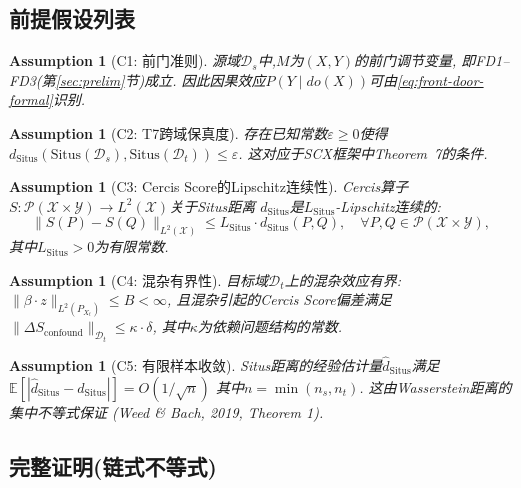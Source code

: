 \documentclass[12pt,a4paper]{article}
\newtheorem{assumption}[theorem]{Assumption}
\newcommand{\E}{\mathbb{E}}
\newcommand{\cX}{\mathcal{X}}
\newcommand{\cY}{\mathcal{Y}}
\newcommand{\cD}{\mathcal{D}}
\newcommand{\cP}{\mathcal{P}}
\newcommand{\Situs}{\mathrm{Situs}}
\begin{document}
\subsection{前提假设列表}

\begin{assumption}[C1: 前门准则]\label{ass:C1}
    源域$\cD_s$中,$M$为$(X,Y)$的前门调节变量,
    即FD1--FD3(第\ref{sec:prelim}节)成立.
    因此因果效应$P(Y \mid do(X))$可由\eqref{eq:front-door-formal}识别.
\end{assumption}

\begin{assumption}[C2: T7跨域保真度]\label{ass:C2}
    存在已知常数$\varepsilon \geq 0$使得
    $d_{\Situs}(\Situs(\cD_s), \Situs(\cD_t)) \leq \varepsilon$.
    这对应于SCX框架中Theorem~7的条件.
\end{assumption}

\begin{assumption}[C3: Cercis Score的Lipschitz连续性]\label{ass:C3}
    Cercis算子$S: \cP(\cX \times \cY) \to L^2(\cX)$关于Situs距离
    $d_{\Situs}$是$L_{\Situs}$-Lipschitz连续的:
    \begin{equation}\label{eq:lipschitz-cercis}
        \|S(P) - S(Q)\|_{L^2(\cX)} \leq L_{\Situs} \cdot d_{\Situs}(P, Q),
        \quad \forall P, Q \in \cP(\cX \times \cY),
    \end{equation}
    其中$L_{\Situs} > 0$为有限常数.
\end{assumption}

\begin{assumption}[C4: 混杂有界性]\label{ass:C4}
    目标域$\cD_t$上的混杂效应有界:
    $\|\beta \cdot z\|_{L^2(P_{X_t})} \leq B < \infty$,
    且混杂引起的Cercis Score偏差满足
    $\|\Delta S_{\mathrm{confound}}\|_{\cD_t} \leq \kappa \cdot \delta$,
    其中$\kappa$为依赖问题结构的常数.
\end{assumption}

\begin{assumption}[C5: 有限样本收敛]\label{ass:C5}
    Situs距离的经验估计量$\hat{d}_{\Situs}$满足
    $\E[|\hat{d}_{\Situs} - d_{\Situs}|] = O(1/\sqrt{n})$
    其中$n = \min(n_s, n_t)$.
    这由Wasserstein距离的集中不等式保证
    (Weed \& Bach, 2019, Theorem 1).
\end{assumption}

\subsection{完整证明(链式不等式)}
\end{document}
